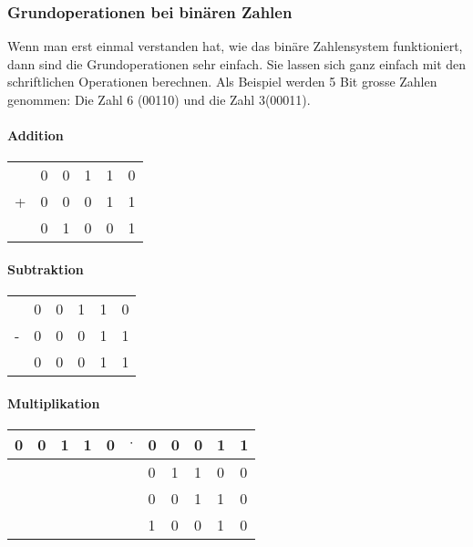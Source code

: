\subsubsection{Grundoperationen bei binären Zahlen}


Wenn man erst einmal verstanden hat, wie das binäre Zahlensystem funktioniert, dann sind die Grundoperationen sehr einfach. Sie lassen sich ganz einfach mit den schriftlichen Operationen berechnen. Als Beispiel werden 5 Bit grosse Zahlen genommen: Die Zahl 6 (00110) und die Zahl 3(00011).


\paragraph{Addition}


\begin{tabular}{llllll}


&0&0&1&1&0 \\


+&0&0&0&1&1 \\ \hline


&0&1&0&0&1


\end{tabular}


\paragraph{Subtraktion}


\begin{tabular}{llllll}


&0&0&1&1&0 \\


-&0&0&0&1&1 \\ \hline


&0&0&0&1&1


\end{tabular}


\paragraph{Multiplikation}


\begin{tabular}{lllllllllll}


0&0&1&1&0& $\cdot$ &0&0&0&1&1 \\ \hline


&&&&&&0&1&1&0&0 \\


&&&&&&0&0&1&1&0 \\ \hline


&&&&&&1&0&0&1&0


\end{tabular}


